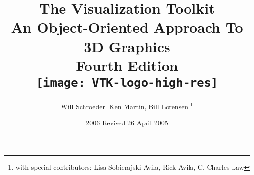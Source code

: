 \title{The Visualization Toolkit \\ An Object-Oriented Approach To 3D Graphics \\ Fourth Edition\\  \texttt{[image: VTK-logo-high-res]}\\}
\author{Will Schroeder, Ken Martin, Bill Lorensen
\thanks{with special contributors: Lisa Sobierajski Avila, Rick Avila, C. Charles Law}
\date {2006 Revised 26 April 2005}}

\clearpage\maketitle
\thispagestyle{empty}




